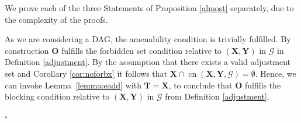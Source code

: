 \documentclass[11pt,a4paper]{article}
\newtheorem{Lemma}[Satz]{Lemma}
\theoremstyle{definition}
\theoremstyle{remark}
\newenvironment{proofof}[1][]{\begin{trivlist}
\item[\hskip \labelsep {\textit{Proof of #1.}}]}{\hfill{}$\square$\end{trivlist}}
\DeclareMathOperator{\de}{de}
\DeclareMathOperator{\CN}{cn}
\newcommand{\g}[1][G]{\mathcal{#1}}
\newcommand{\cnb}[2][X,Y]{\CN(\mathbf{#1},#2)}
\begin{document}
%
%
%	
%


We prove each of the three Statements of Proposition \ref{almost} separately, due to the complexity of the proofs.

\begin{proofof}[Statement \ref{VAS} of Proposition~\ref{almost}]
	As we are considering a DAG, the amenability condition is trivially fulfilled.
	By construction $\mathbf{O}$ fulfills the forbidden set condition relative to $(\mathbf{X,Y})$ in $\g$ in Definition \ref{adjustment}. By the assumption that there exists a valid adjustment set and Corollary \ref{cor:noforbx} it follows that $\mathbf{X} \cap \cnb{\g}  = \emptyset$. Hence, we can invoke Lemma~\ref{lemma:eadd} with $\mathbf{T} = \mathbf{X}$, to conclude that $\mathbf{O}$ fulfills the blocking condition relative to $(\mathbf{X,Y})$ in $\g$ from Definition \ref{adjustment}. 
	
\end{proofof}
\end{document}
